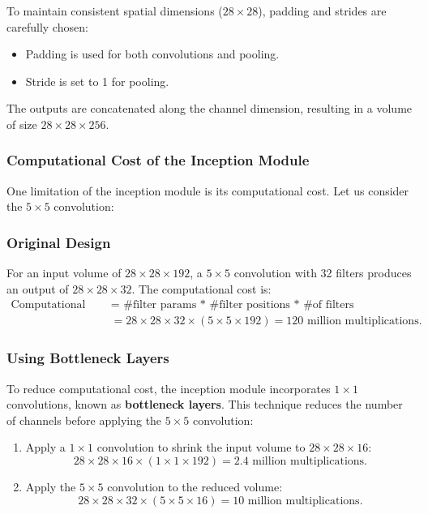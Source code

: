\documentclass[letterpaper,12pt,notitlepage,twoside]{report}
\begin{document}
To maintain consistent spatial dimensions ($28 \times 28$), padding and strides are carefully chosen:
\begin{itemize}[nosep]
    \item Padding is used for both convolutions and pooling.
    \item Stride is set to 1 for pooling.
\end{itemize}

The outputs are concatenated along the channel dimension, resulting in a volume of size $28 \times 28 \times 256$.

\subsubsection*{Computational Cost of the Inception Module}
One limitation of the inception module is its computational cost. Let us consider the $5 \times 5$ convolution:

\subsubsection*{Original Design}
For an input volume of $28 \times 28 \times 192$, a $5 \times 5$ convolution with 32 filters produces an output of $28 \times 28 \times 32$. The computational cost is:
\begin{align*}
\text{Computational cost} &= \text{ \#filter params * \# filter positions * \# of filters}  \\
 & = 28 \times 28 \times 32 \times (5 \times 5 \times 192) = 120 \text{ million multiplications}.
\end{align*}

\subsubsection*{Using Bottleneck Layers}
To reduce computational cost, the inception module incorporates $1 \times 1$ convolutions, known as \textbf{bottleneck layers}. This technique reduces the number of channels before applying the $5 \times 5$ convolution:
\begin{enumerate}
    \item Apply a $1 \times 1$ convolution to shrink the input volume to $28 \times 28 \times 16$:
    \[
    28 \times 28 \times 16 \times (1 \times 1 \times 192) = 2.4 \text{ million multiplications}.
    \]
    \item Apply the $5 \times 5$ convolution to the reduced volume:
    \[
    28 \times 28 \times 32 \times (5 \times 5 \times 16) = 10 \text{ million multiplications}.
    \]
\end{enumerate}
\end{document}

